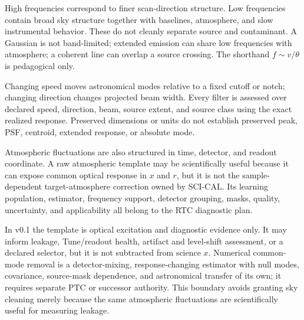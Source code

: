 \documentclass[10pt]{article}
\begin{document}
High frequencies correspond to finer scan-direction structure. Low
frequencies contain broad sky structure together with baselines, atmosphere,
and slow instrumental behavior. These do not cleanly separate source and
contaminant. A Gaussian is not band-limited; extended emission can share low
frequencies with atmosphere; a coherent line can overlap a source crossing.
The shorthand $f\sim v/\theta$ is pedagogical only.

\begin{center}
\end{center}

Changing speed moves astronomical modes relative to a fixed cutoff or notch;
changing direction changes projected beam width. Every filter is assessed
over declared speed, direction, beam, source extent, and source class using
the exact realized response. Preserved dimensions or units do not establish
preserved peak, PSF, centroid, extended response, or absolute mode.

Atmospheric fluctuations are also structured in time, detector, and readout
coordinate.  A raw atmospheric template may be scientifically useful because
it can expose common optical response in $x$ and $r$, but it is not the
sample-dependent target-atmosphere correction owned by SCI-CAL.  Its learning
population, estimator, frequency support, detector grouping, masks, quality,
uncertainty, and applicability all belong to the RTC diagnostic plan.

In v0.1 the template is optical excitation and diagnostic evidence only.  It
may inform leakage, Tune/readout health, artifact and level-shift assessment,
or a declared selector, but it is not subtracted from science $x$.  Numerical
common-mode removal is a detector-mixing, response-changing estimator with
null modes, covariance, source-mask dependence, and astronomical transfer of
its own; it requires separate PTC or successor authority.  This boundary
avoids granting sky cleaning merely because the same atmospheric fluctuations
are scientifically useful for measuring leakage.
\end{document}
